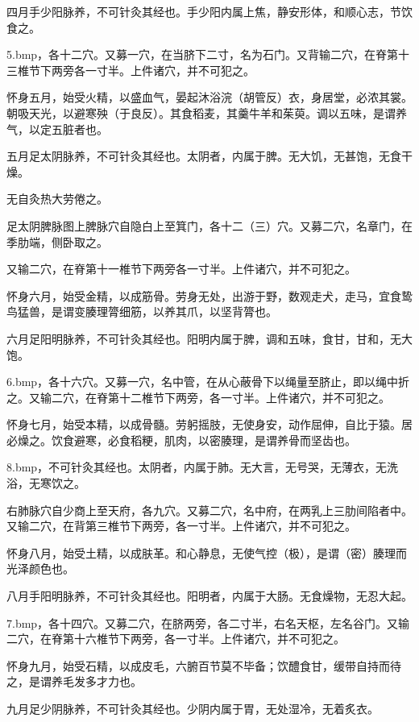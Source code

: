 \documentclass[a4paper,12pt,UTF8,twoside]{ctexbook}
\begin{document}
四月手少阳脉养，不可针灸其经也。手少阳内属上焦，静安形体，和顺心志，节饮食之。

\pyxfc5.bmp，各十二穴。又募一穴，在当脐下二寸，名为石门。又背输二穴，在脊第十三椎节下两旁各一寸半。上件诸穴，并不可犯之。

怀身五月，始受火精，以盛血气，晏起沐浴浣（胡管反）衣，身居堂，必浓其裳。朝吸天光，以避寒殃（于良反）。其食稻麦，其羹牛羊和茱萸。调以五味，是谓养气，以定五脏者也。

五月足太阴脉养，不可针灸其经也。太阴者，内属于脾。无大饥，无甚饱，无食干燥。

无自灸热大劳倦之。

足太阴脾脉图上脾脉穴自隐白上至箕门，各十二（三）穴。又募二穴，名章门，在季肋端，侧卧取之。

又输二穴，在脊第十一椎节下两旁各一寸半。上件诸穴，并不可犯之。

怀身六月，始受金精，以成筋骨。劳身无处，出游于野，数观走犬，走马，宜食鸷鸟猛兽，是谓变腠理膂细筋，以养其爪，以坚背膂也。

六月足阳明脉养，不可针灸其经也。阳明内属于脾，调和五味，食甘，甘和，无大饱。

\pyxfc6.bmp，各十六穴。又募一穴，名中管，在从心蔽骨下以绳量至脐止，即以绳中折之。又输二穴，在脊第十二椎节下两旁，各一寸半。上件诸穴，并不可犯之。

怀身七月，始受本精，以成骨髓。劳躬摇肢，无使身安，动作屈伸，自比于猿。居必燥之。饮食避寒，必食稻粳，肌肉，以密腠理，是谓养骨而坚齿也。

\pyxfc8.bmp，不可针灸其经也。太阴者，内属于肺。无大言，无号哭，无薄衣，无洗浴，无寒饮之。

右肺脉穴自少商上至天府，各九穴。又募二穴，名中府，在两乳上三肋间陷者中。又输二穴，在背第三椎节下两旁，各一寸半。上件诸穴，并不可犯之。

怀身八月，始受土精，以成肤革。和心静息，无使气控（极），是谓（密）腠理而光泽颜色也。

八月手阳明脉养，不可针灸其经也。阳明者，内属于大肠。无食燥物，无忍大起。

\pyxfc7.bmp，各十四穴。又募二穴，在脐两旁，各二寸半，右名天枢，左名谷门。又输二穴，在脊第十六椎节下两旁，各一寸半。上件诸穴，并不可犯之。

怀身九月，始受石精，以成皮毛，六腑百节莫不毕备；饮醴食甘，缓带自持而待之，是谓养毛发多才力也。

九月足少阴脉养，不可针灸其经也。少阴内属于胃，无处湿冷，无着炙衣。
\end{document}
